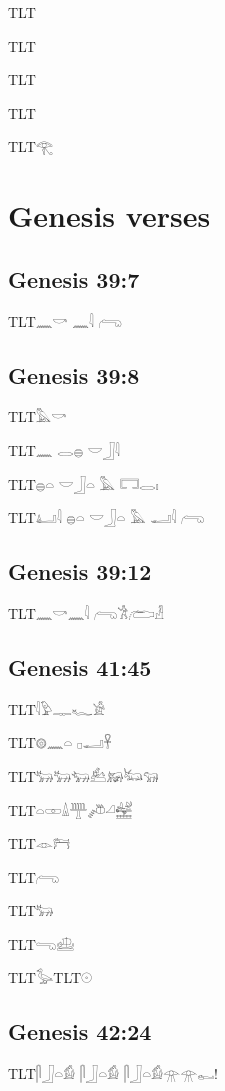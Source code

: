 \documentclass[11pt]{article}
\newcommand{\egypt}[1]{{\leavevmode\textdir TLT\NewGardinerFont #1}}
\newcommand{\egV}[2]{%
  \raisebox{-.35em}{\shortstack{%
    \resizebox{!}{.68em}{#1}\\[-.28em]
    \resizebox{!}{.68em}{#2}}}}
\newcommand{\egScale}[2]{\scalebox{#1}{#2}}
\newcommand{\egWide}[2]{\scalebox{#1}[1]{#2}}
\newcommand{\egTall}[2]{\scalebox{1}[#1]{#2}}
\newcommand{\egRaise}[2]{\raisebox{#1}{#2}}
\begin{document}
\egypt{𓨈}

\egypt{𓒑}

\egypt{\egScale{3.0}{𓒑}}

\egypt{\egV{\egScale{3.00}{𓂺}}{𓂀}}

\egypt{𓂀\egRaise{1.0em}{\egTall{2.0}{\egWide{3.00}{𓂺}}}}

\section*{Genesis verses}

\subsection*{Genesis 39:7}

\egypt{𓈖𓎡 𓈖𓇋 𓂺}

\subsection*{Genesis 39:8}

\egypt{𓅓𓎡}

\egypt{𓈖 𓂋𓐍 𓎟𓃀𓇋}

\egypt{𓐍𓏏 𓎟𓃀𓏏 𓅓 𓉐𓂋𓏤}

\egypt{𓂞𓇋 𓐍𓏏 𓎟𓃀𓏏 𓅓 𓂝𓇋 𓂺}

\subsection*{Genesis 39:12}

\egypt{𓈖𓎡𓈖𓇋 𓂺𓀟𓂨𓁐}

\subsection*{Genesis 41:45}

\egypt{𓇋𓅱𓊃𓆑𓀀}

\egypt{𓊗𓈖𓏏 𓊪𓂝𓋹}

\egypt{𓃒𓃽𓃓𓃕𓃖𓃜𓃔}

\egypt{𓏏𓏒𓏙𓊰𓌾𓏘𓉅}

\egypt{𓁹𓁀}

\egypt{𓂺}

\egypt{𓃒}

\egypt{𓂸𓊝}

\egypt{𓅭}\egypt{𓇳}

\subsection*{Genesis 42:24}

\egypt{𓋴𓃀𓏏𓀁 𓋴𓃀𓏏𓀁 𓋴𓃀𓏏𓀁𓁿𓁿𓀿!}
\end{document}
